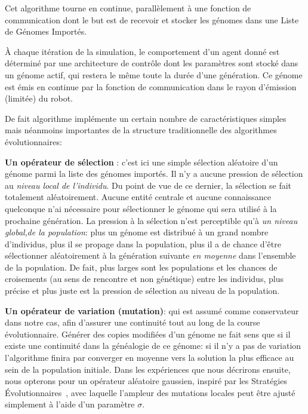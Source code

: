 \documentclass[a4paper,10pt]{report}
\begin{document}

Cet algorithme tourne en continue, parallèlement à une fonction de communication dont le but est de recevoir et stocker les génomes dans une Liste de Génomes Importés.

À chaque itération de la simulation, le comportement d'un agent donné est déterminé par une architecture de contrôle dont les paramètres sont stocké dans un génome actif, qui restera le même toute la durée d'une génération. Ce génome est émis en continue par la fonction de communication dans le rayon d'émission (limitée) du robot.

De fait algorithme implémente un certain nombre de caractéristiques simples mais néanmoins importantes de la structure traditionnelle des algorithmes évolutionnaires:

\textbf{Un opérateur de sélection }: c'est ici une simple sélection aléatoire d'un génome parmi la liste des génomes importés. Il n'y a aucune pression de sélection au \emph{niveau local de l'individu}.  Du point de vue de ce dernier, la sélection se fait totalement aléatoirement. Aucune entité centrale et aucune connaissance quelconque n'ai nécessaire pour sélectionner le génome  qui sera utilisé à la prochaine génération. La pression à la sélection n'est perceptible qu'à \emph{un niveau global},\emph{de la population}: plus un génome est distribué à un grand nombre d'individus, plus il se propage dans la population, plus il a de chance d'être sélectionner aléatoirement à la génération suivante \emph{en moyenne} dans l'ensemble de la population. De fait, plus larges sont les populations et les chances de croisements (au sens de rencontre et non génétique) entre les individus, plus précise et plus juste est la pression de sélection au niveau de la population.

\textbf{Un opérateur de variation (mutation)}: qui est assumé comme conservateur dans notre cas, afin d'assurer une continuité tout au long de la course évolutionnaire. Générer des copies modifiées d'un génome ne fait sens que si il existe une continuité dans la généalogie de ce génome: si il n'y a pas de variation l'algorithme finira par converger en moyenne vers la solution la plus efficace au sein de la population initiale. Dans les expériences que nous décrirons ensuite, nous opterons pour un opérateur aléatoire gaussien, inspiré par les Stratégies \'{E}volutionnaires~\cite{Beyer2002Evolution-strat}, avec laquelle l'ampleur des mutations locales peut être ajusté simplement à l'aide d'un paramètre $\sigma$.
\end{document}
